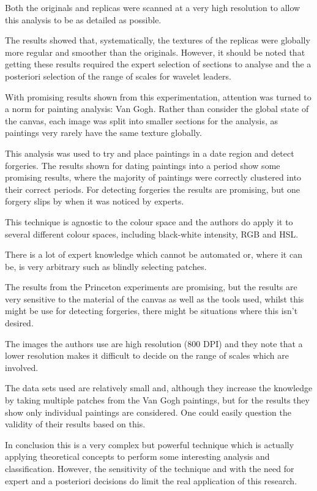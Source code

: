 \documentclass[conference]{IEEEtran}
\begin{document}
Both the originals and replicas were scanned at a very high resolution to allow
this analysis to be as detailed as possible.

The results showed that, systematically, the textures of the replicas were
globally more regular and smoother than the originals. However, it should be
noted that getting these results required the expert selection of sections to
analyse and the a posteriori selection of the range of scales for wavelet
leaders.

With promising results shown from this experimentation, attention was turned to
a norm for painting analysis: Van Gogh. Rather than consider the global state
of the canvas, each image was split into smaller sections for the analysis, as
paintings very rarely have the same texture globally.

This analysis was used to try and place paintings in a date region and detect
forgeries. The results shown for dating paintings into a period show some
promising results, where the majority of paintings were correctly clustered
into their correct periods. For detecting forgeries the results are promising,
but one forgery slips by when it was noticed by experts.

This technique is agnostic to the colour space and the authors do apply it to
several different colour spaces, including black-white intensity, \gls{RGB} and
\gls{HSL}.

There is a lot of expert knowledge which cannot be automated or, where it can
be, is very arbitrary such as blindly selecting patches.

The results from the Princeton experiments are promising, but the results are
very sensitive to the material of the canvas as well as the tools used, whilst
this might be use for detecting forgeries, there might be situations where this
isn't desired.

The images the authors use are high resolution (800 DPI) and they note that a
lower resolution makes it difficult to decide on the range of scales which are
involved.

The data sets used are relatively small and, although they increase the
knowledge by taking multiple patches from the Van Gogh paintings, but for the
results they show only individual paintings are considered. One could easily
question the validity of their results based on this.

In conclusion this is a very complex but powerful technique which is actually
applying theoretical concepts to perform some interesting analysis and
classification. However, the sensitivity of the technique and with the need for
expert and a posteriori decisions do limit the real application of this
research.
\end{document}
